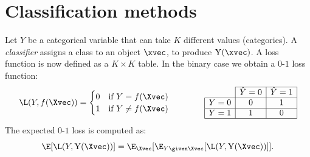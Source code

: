 \section{Classification methods}

Let $Y$ be a categorical variable that can take $K$ different values (categories). A \emph{classifier} assigns a class to an object $\xvec$, to produce $\operatorname{Y}(\xvec)$. A loss function is now defined as a $K\times K$ table. In the binary case we obtain a $0$-$1$ loss function:
\begin{equation}
    \L(Y\negthinspace, f(\Xvec)) = \begin{cases}
        0 & \text{if } Y = f(\Xvec)    \\
        1 & \text{if } Y \neq f(\Xvec)
    \end{cases}\qquad\qquad \begin{array}{|c|c|c|}
        \cline{2-3}
        \multicolumn{1}{c|}{} & \hat{Y} = 0 & \hat{Y} = 1 \\
        \hline
        Y = 0                 & 0           & 1           \\
        \hline
        Y = 1                 & 1           & 0           \\
        \hline
    \end{array}
\end{equation}
The expected $0$-$1$ loss is computed as:
\begin{equation}
    \E[\L(Y\negthinspace, \operatorname{Y}(\Xvec))] = \E_{\Xvec}[\E_{Y\given \Xvec}[\L(Y\negthinspace, \operatorname{Y}(\Xvec))]].
\end{equation}

